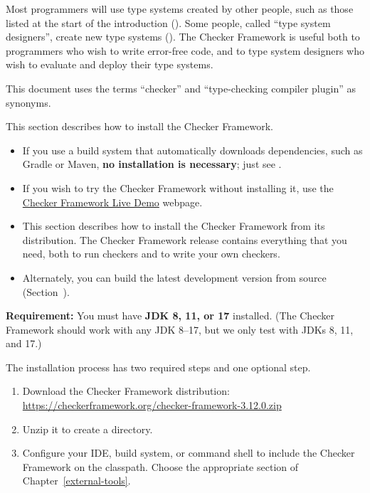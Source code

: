 Most programmers will use type systems created by other people, such as
those listed at the start of the introduction ().
Some people, called ``type system designers'', create new type systems
().
The Checker Framework is useful both to programmers who
wish to write error-free code, and to type system designers who wish to
evaluate and deploy their type systems.

This document uses the terms ``checker'' and ``type-checking compiler
plugin'' as synonyms.


This section describes how to install the Checker Framework.
\begin{itemize}
\item
If you use a build system that automatically downloads dependencies,
such as Gradle or Maven, \textbf{no installation is necessary}; just see
.
\item
If you wish to try the Checker Framework without installing it, use the
\href{http://eisop.uwaterloo.ca/live/}{Checker Framework Live Demo} webpage.
\item
This section describes how to install the Checker Framework from its
distribution.  The Checker Framework release contains everything that you
need, both to run checkers and to write your own checkers.
\item
Alternately, you can build the latest development version from source
(Section~).
\end{itemize}


\textbf{Requirement:}
You must have \textbf{JDK 8, 11, or 17} installed.
(The Checker Framework should work with any JDK 8--17, but we only test with JDKs 8, 11, and 17.)

The installation process has two required steps and one
optional step.
\begin{enumerate}
\item
  Download the Checker Framework distribution:
  \\
  \url{https://checkerframework.org/checker-framework-3.12.0.zip}

\item
  Unzip it to create a  directory.

\item
  \label{installation-configure-step}%
  Configure your IDE, build system, or command shell to include the Checker
  Framework on the classpath.  Choose the appropriate section of
  Chapter~\ref{external-tools}.


\end{enumerate}

